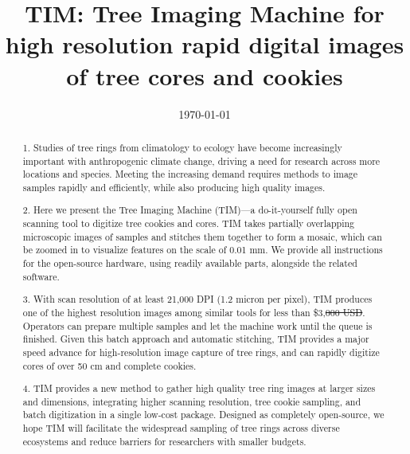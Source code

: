 \documentclass[a4paper,12pt]{article}
\title{TIM: Tree Imaging Machine for high resolution rapid digital images of tree cores and cookies}
\date{\today}
\makeatletter
\providecommand{\DIFadd}[1]{{\protect\color{blue}\uwave{#1}}} %
\providecommand{\DIFdel}[1]{{\protect\color{red}\sout{#1}}} %
\providecommand{\DIFaddbegin}{} %
\providecommand{\DIFaddend}{} %
\providecommand{\DIFdelbegin}{} %
\providecommand{\DIFdelend}{} %
\providecommand{\DIFscaledelfig}{0.5}
\newlength{\DIFdelgraphicswidth} %
\newlength{\DIFdelgraphicsheight} %
\providecommand{\DIFaddincludegraphics}[2][]{{\color{blue}\fbox{\DIFOincludegraphics[#1]{#2}}}} %
\providecommand{\DIFdelincludegraphics}[2][]{%
\sbox{\DIFdelgraphicsbox}{\DIFOincludegraphics[#1]{#2}}%
\settoboxwidth{\DIFdelgraphicswidth}{\DIFdelgraphicsbox} %
\settoboxtotalheight{\DIFdelgraphicsheight}{\DIFdelgraphicsbox} %
\scalebox{\DIFscaledelfig}{%
\parbox[b]{\DIFdelgraphicswidth}{\usebox{\DIFdelgraphicsbox}\\[-\baselineskip] \rule{\DIFdelgraphicswidth}{0em}}\llap{\resizebox{\DIFdelgraphicswidth}{\DIFdelgraphicsheight}{%
\setlength{\unitlength}{\DIFdelgraphicswidth}%
\begin{picture}(1,1)%
\thicklines\linethickness{2pt} %
{\color[rgb]{1,0,0}\put(0,0){\framebox(1,1){}}}%
{\color[rgb]{1,0,0}\put(0,0){\line( 1,1){1}}}%
{\color[rgb]{1,0,0}\put(0,1){\line(1,-1){1}}}%
\end{picture}%
}\hspace*{3pt}}} %
} %
\DeclareRobustCommand{\DIFaddbegin}{\DIFOaddbegin \let\includegraphics\DIFaddincludegraphics} %
\DeclareRobustCommand{\DIFaddend}{\DIFOaddend \let\includegraphics\DIFOincludegraphics} %
\DeclareRobustCommand{\DIFdelbegin}{\DIFOdelbegin \let\includegraphics\DIFdelincludegraphics} %
\DeclareRobustCommand{\DIFdelend}{\DIFOaddend \let\includegraphics\DIFOincludegraphics} %
\let\sout@orig\sout %
\renewcommand{\sout}[1]{\ifmmode\text{\sout@orig{\ensuremath{#1}}}\else\sout@orig{#1}\fi} %
\makeatother
\begin{document}
\linenumbers
\doublespacing
\maketitle

\begin{abstract}  

1.  Studies of tree rings from climatology to ecology have become increasingly important with anthropogenic climate change, driving a need for research across more locations and species. Meeting the increasing demand requires methods to image samples rapidly and efficiently, while also producing high quality images. %

2.  Here we present the Tree Imaging Machine (TIM)---a do-it-yourself fully open scanning tool to digitize tree cookies and cores. TIM takes partially overlapping microscopic images of samples and stitches them together to form a mosaic, which can be zoomed in to visualize features on the scale of 0.01 mm. 
We provide all instructions for the open-source hardware, using readily available parts, alongside the related software. %

3. With scan resolution of at least 21,000 DPI (1.2 micron per pixel), TIM produces one of the highest resolution images among similar tools for less than \$3,\DIFdelbegin \DIFdel{000 USD}\DIFdelend \DIFaddbegin \DIFadd{500 CAD}\DIFaddend . Operators can prepare multiple samples and let the machine work until the queue is finished. Given this batch approach and automatic stitching, TIM provides a major speed advance for high-resolution image capture of tree rings, and can rapidly digitize cores of over 50 cm and complete cookies. %

4. TIM provides a new method to gather high quality tree ring images at larger sizes and dimensions, integrating higher scanning resolution, tree cookie sampling, and batch digitization in a single low-cost package. 
Designed as completely open-source, we hope TIM will facilitate the widespread sampling of tree rings across diverse ecosystems and reduce barriers for researchers with smaller budgets. 

\end{abstract}
\end{document}
